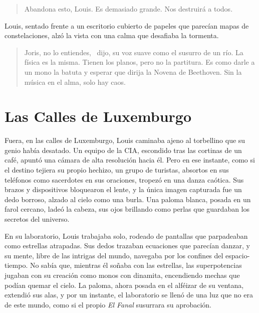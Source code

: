 \begin{quote}
\calli
\glqq Abandona esto, Louis. Es demasiado grande. Nos destruirá a todos.\grqq
\end{quote}

Louis, sentado frente a un escritorio cubierto de papeles que parecían mapas de constelaciones, alzó la vista con una calma que desafiaba la tormenta.

\begin{quote}
\calli
\glqq Joris, no lo entiendes,\grqq~ dijo, su voz suave como el susurro de un río. \glqq La física es la misma. Tienen los planos, pero no la partitura. Es como darle a un mono la batuta y esperar que dirija la Novena de Beethoven. Sin la música en el alma, solo hay caos.\grqq
\end{quote}

\section{Las Calles de Luxemburgo}

Fuera, en las calles de Luxemburgo, Louis caminaba ajeno al torbellino que su genio había desatado. Un equipo de la CIA, escondido tras las cortinas de un café, apuntó una cámara de alta resolución hacia él. Pero en ese instante, como si el destino tejiera su propio hechizo, un grupo de turistas, absortos en sus teléfonos como sacerdotes en sus oraciones, tropezó en una danza caótica. Sus brazos y dispositivos bloquearon el lente, y la única imagen capturada fue un dedo borroso, alzado al cielo como una burla. Una paloma blanca, posada en un farol cercano, ladeó la cabeza, sus ojos brillando como perlas que guardaban los secretos del universo.

En su laboratorio, Louis trabajaba solo, rodeado de pantallas que parpadeaban como estrellas atrapadas. Sus dedos trazaban ecuaciones que parecían danzar, y su mente, libre de las intrigas del mundo, navegaba por los confines del espacio-tiempo. No sabía que, mientras él soñaba con las estrellas, las superpotencias jugaban con su creación como monos con dinamita, encendiendo mechas que podían quemar el cielo. La paloma, ahora posada en el alféizar de su ventana, extendió sus alas, y por un instante, el laboratorio se llenó de una luz que no era de este mundo, como si el propio \emph{El Fanal} susurrara su aprobación.

